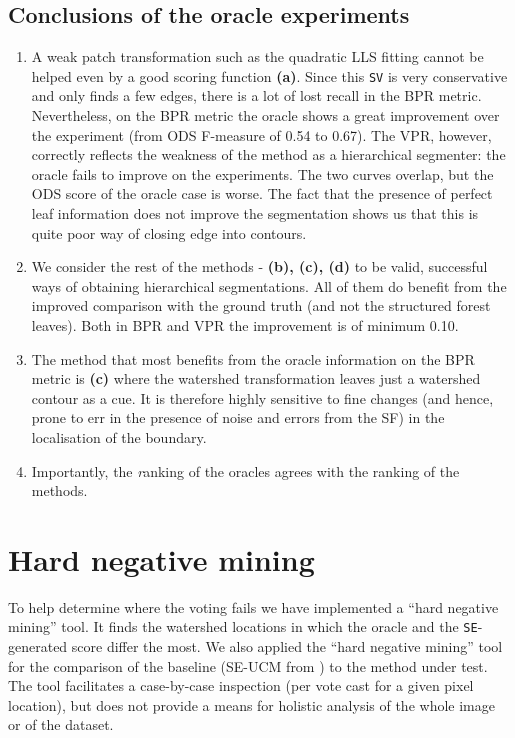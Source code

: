 \subsection{Conclusions of the oracle experiments}
\begin{enumerate}
 \item A weak patch transformation such as the quadratic LLS fitting cannot be helped even by a good scoring function {\bf (a)}. Since this {\tt SV} is very conservative and only finds a few edges, there is a lot of lost recall in the BPR metric. Nevertheless, on the BPR metric the oracle shows a great improvement over the experiment (from ODS F-measure of 0.54 to 0.67). 
 The VPR, however, correctly reflects the weakness of the method as a hierarchical segmenter: the oracle fails to improve on the experiments. The two curves overlap, but the ODS score of the oracle case is worse. %
 The fact that the presence of perfect leaf information does not improve the segmentation shows us that this is quite poor way of closing edge into contours.
 \item We consider the rest of the methods - {\bf (b), (c), (d)} to be valid, successful ways of obtaining hierarchical segmentations. All of them do benefit from the improved comparison with the ground truth (and not the structured forest leaves). Both in BPR and VPR the improvement is of minimum 0.10.
 \item The method that most benefits from the oracle information on the BPR metric is {\bf (c)} where the watershed transformation leaves just a watershed contour as a cue. It is therefore highly %
 sensitive to fine changes (and hence, prone to err in the presence of noise and errors from the SF) in the localisation of the boundary.
 \item Importantly, the {\emph ranking of the oracles agrees with the ranking of the methods}.
\end{enumerate}

\section{Hard %
negative mining}
To help determine where the voting fails %
we have implemented a ``hard negative mining'' tool. It finds %
the watershed locations in which the oracle and the {\tt SE}-generated score differ the most. We also applied the ``hard negative mining'' tool for the comparison of the baseline (SE-UCM from ) to the method under test. The tool facilitates a case-by-case %
inspection (per vote cast for a given pixel location), but does not provide a means for holistic analysis of the whole image or of the dataset.


